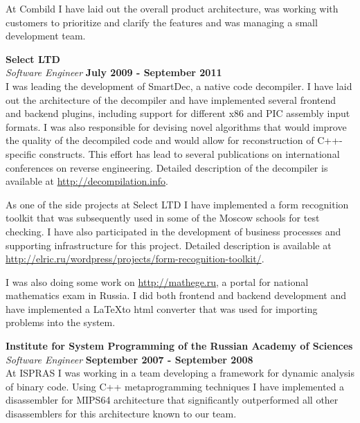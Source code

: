 \documentclass[margin,line]{CV}
\begin{document}
\begin{resume}
    At Combild I have laid out the overall product architecture, was working with customers to prioritize and clarify the features and was managing a small development team.
    

    
    \textbf{Select LTD} \vspace{2mm}\\\vspace{1mm}%
    \textsl{Software Engineer} \hfill \textbf{July 2009 - September 2011}\\
    I was leading the development of SmartDec, a native code decompiler. I have laid out the architecture of the decompiler and have implemented several frontend and backend plugins, including support for different x86 and PIC assembly input formats. I was also responsible for devising novel algorithms that would improve the quality of the decompiled code and would allow for reconstruction of C++-specific constructs. This effort has lead to several publications on international conferences on reverse engineering. Detailed description of the decompiler is available at \url{http://decompilation.info}.
    
    As one of the side projects at Select LTD I have implemented a form recognition toolkit that was subsequently used in some of the Moscow schools for test checking. I have also participated in the development of business processes and supporting infrastructure for this project. Detailed description is available at \url{http://elric.ru/wordpress/projects/form-recognition-toolkit/}. 

    I was also doing some work on \url{http://mathege.ru}, a portal for national mathematics exam in Russia. I did both frontend and backend development and have implemented a \LaTeX to html converter that was used for importing problems into the system.

    
    \textbf{Institute for System Programming of the Russian Academy of Sciences} \vspace{2mm}\\\vspace{1mm}%
    \textsl{Software Engineer} \hfill \textbf{September 2007 - September 2008}\\
    At ISPRAS I was working in a team developing a framework for dynamic analysis of binary code. Using C++ metaprogramming techniques I have implemented a disassembler for MIPS64 architecture that significantly outperformed all other disassemblers for this architecture known to our team.


\end{resume}
\end{document}
